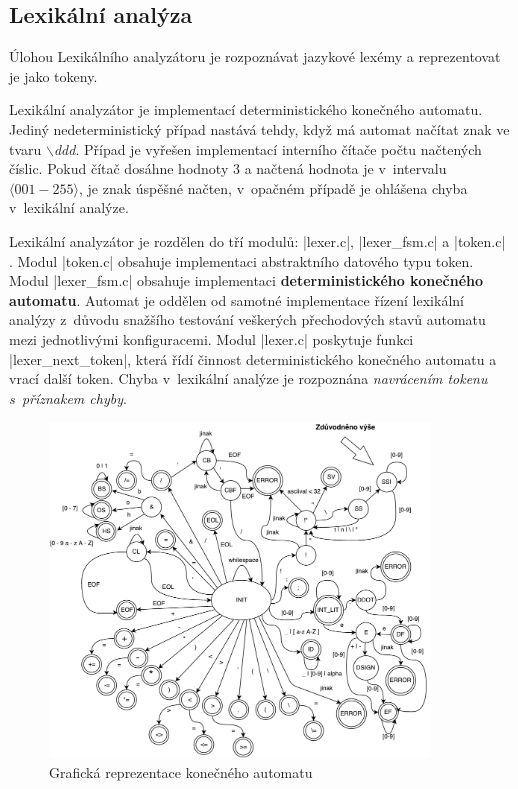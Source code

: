 \subsection{Lexikální analýza}
\label{subsec:lexer}
Úlohou Lexikálního analyzátoru je rozpoznávat jazykové lexémy a reprezentovat
je jako tokeny.

Lexikální analyzátor je implementací deterministického konečného
automatu. Jediný nedeterministický případ nastává tehdy, když má automat načítat znak ve tvaru $\backslash$\emph{ddd}.
Případ je vyřešen implementací interního čítače počtu načtených číslic. Pokud čítač dosáhne hodnoty 3 a načtená hodnota je
v~intervalu $\langle 001 - 255\rangle$, je znak úspěšné načten, v~opačném případě je ohlášena chyba v~lexikální
analýze.

Lexikální analyzátor je rozdělen do tří modulů: \ic|lexer.c|, \ic|lexer_fsm.c| a \ic|token.c|
. Modul \ic|token.c| obsahuje implementaci abstraktního datového typu token. Modul \ic|lexer_fsm.c|
obsahuje implementaci \textbf{deterministického konečného automatu}. Automat je oddělen od samotné implementace řízení lexikální analýzy z~důvodu snažšího testování veškerých přechodových stavů automatu mezi jednotlivými konfiguracemi. Modul \ic|lexer.c| poskytuje funkci
\ic|lexer_next_token|, která řídí činnost deterministického konečného automatu a vrací další token. Chyba v~lexikální analýze je rozpoznána \emph{navrácením tokenu s~příznakem chyby}.

\begin{figure}[htbp]
    \label{subsec:automat}
    \caption{Grafická reprezentace konečného automatu}
    \centering
    \includegraphics[width=0.9\textwidth, angle=0]{src/assets/automat.pdf}
\end{figure}


